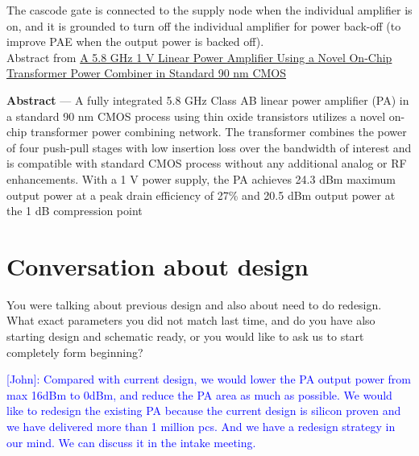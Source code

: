 \documentclass{article}
\begin{document}
The cascode gate is connected to the supply node when the individual amplifier is on, and it is grounded to turn off the individual amplifier for power back-off (to improve PAE when the output power is backed off).\\


Abstract from \href{https://ieeexplore.ieee.org/document/4494655}{A 5.8 GHz 1 V Linear Power Amplifier Using a Novel On-Chip Transformer Power Combiner in Standard 90 nm CMOS}

\begin{info}
	\textbf{Abstract} — A fully integrated 5.8 GHz Class AB linear power amplifier (PA) in a standard 90 nm CMOS process using thin oxide transistors utilizes a novel on-chip transformer power combining network. The transformer combines the power of four push-pull stages with low insertion loss over the bandwidth of interest and is compatible with standard CMOS process without any additional analog or RF enhancements. With a 1 V power supply, the PA achieves 24.3 dBm maximum output power at a peak drain efficiency of 27\% and 20.5 dBm output power at the 1 dB compression point
\end{info}





\section{Conversation about design}

You were talking about previous design and also about need to do redesign. What exact parameters you did not match last time, and do you have also starting design and schematic ready, or you would like to ask us to start completely form beginning?

\textcolor{blue}{[John]: Compared with current design, we would lower the PA output power from max 16dBm to 0dBm, and reduce the PA area as much as possible. We would like to redesign the existing PA because the current design is silicon proven and we have delivered more than 1 million pcs. And we have a redesign strategy in our mind. We can discuss it in the intake meeting.}
\end{document}
